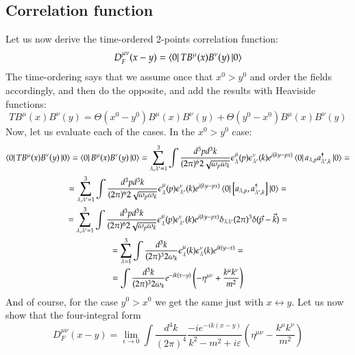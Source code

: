 \documentclass{article}
\begin{document}
\subsection{Correlation function}
Let us now derive the time-ordered 2-points correlation function:
\begin{equation*}
    D^{\mu\nu}_F(x - y) = \bra{0} T B^\mu(x) B^\nu(y) \ket{0}
\end{equation*}
The time-ordering says that we assume once that $x^0 > y^0$ and order the fields accordingly, and then do the opposite, and add the results with Heaviside functions:
\begin{equation*}
    T B^\mu(x) B^\nu(y) = \Theta(x^0 - y^0) B^\mu(x) B^\nu(y) + \Theta(y^0 - x^0) B^\mu(x) B^\nu(y)
\end{equation*}
Now, let us evaluate each of the cases. In the $x^0 > y^0$ case:
\begin{equation*}
\begin{gathered}
    \bra{0}T B^\mu(x) B^\nu(y) \ket{0} = 
    \bra{0} B^\mu(x) B^\nu(y) \ket{0} = 
    \sum_{\lambda, \lambda'=1}^3 \int \frac{d^3p d^3k}{(2\pi)^6 2\sqrt{\omega_p\omega_k}} \epsilon^\mu_\lambda(p)\epsilon^\nu_{\lambda'}(k) e^{i(ky - px)} \bra{0} a_{\lambda, p}a^\dagger_{\lambda', k} \ket{0} = \\ =
    \sum_{\lambda, \lambda'=1}^3 \int \frac{d^3p d^3k}{(2\pi)^6 2\sqrt{\omega_p\omega_k}} \epsilon^\mu_\lambda(p)\epsilon^\nu_{\lambda'}(k) e^{i(ky - px)} \bra{0} \left[a_{\lambda, p}, a^\dagger_{\lambda', k}\right] \ket{0} = \\ =
    \sum_{\lambda, \lambda'=1}^3 \int \frac{d^3p d^3k}{(2\pi)^6 2\sqrt{\omega_p\omega_k}} \epsilon^\mu_\lambda(p)\epsilon^\nu_{\lambda'}(k) e^{i(ky - px)} \delta_{\lambda \lambda'}(2\pi)^3\delta(\vec{p} - \vec{k}) = \\ =
    \sum_{\lambda=1}^3 \int \frac{d^3k}{(2\pi)^3 2\omega_k} \epsilon^\mu_\lambda(k)\epsilon^\nu_{\lambda}(k) e^{ik(y - x)}
    = \\ =
    \int \frac{d^3k}{(2\pi)^3 2\omega_k} e^{-ik(x - y)} \left(-\eta^{\mu\nu} + \frac{k^\mu k^\nu}{m^2}\right)
\end{gathered}
\end{equation*}
And of course, for the case $y^0 > x^0$ we get the same just with $x \leftrightarrow y$. Let us now show that the four-integral form
\begin{equation*}
    D^{\mu\nu}_F(x-y) = \lim_{\epsilon \rightarrow 0} \int \frac{d^4k}{(2\pi)^4}\frac{-ie^{-ik(x-y)}}{k^2 - m^2 + i\varepsilon}\left(\eta^{\mu\nu} - \frac{k^\mu k^\nu}{m^2}\right)
\end{equation*}
\end{document}
